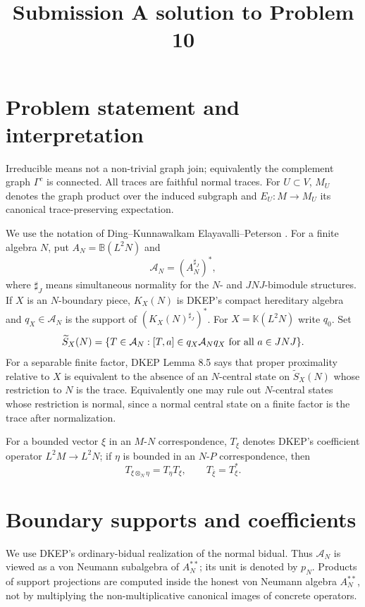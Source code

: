 \documentclass[12pt]{article}
\newcommand{\cA}{\mathcal A}
\begin{document}
\title{Submission A solution to Problem 10}
\date{}
\maketitle


\section*{Problem statement and interpretation}

Irreducible means not a non-trivial graph join; equivalently the complement
graph \(\Gamma^c\) is connected.  All traces are faithful normal traces.  For
\(U\subset V\), \(M_U\) denotes the graph product over the induced subgraph and
\(E_U:M\to M_U\) its canonical trace-preserving expectation.

We use the notation of Ding--Kunnawalkam Elayavalli--Peterson \cite{DKEP}.
For a finite algebra \(N\), put \(A_N=\mathbb B(L^2N)\) and
\[
        \cA_N=(A_N^{\sharp_J})^*,
\]
where \(\sharp_J\) means simultaneous normality for the \(N\)- and
\(JNJ\)-bimodule structures.  If \(X\) is an \(N\)-boundary piece, \(K_X(N)\)
is DKEP's compact hereditary algebra and \(q_X\in\cA_N\) is the support of
\((K_X(N)^{\sharp_J})^*\).  For \(X=\mathbb K(L^2N)\) write \(q_0\).  Set
\[
 \widetilde S_X(N)=\{T\in\cA_N:[T,a]\in q_X\cA_Nq_X\hbox{ for all }
 a\in JNJ\}.
\]
For a separable finite factor, DKEP Lemma 8.5 says that proper proximality
relative to \(X\) is equivalent to the absence of an \(N\)-central state on
\(\widetilde S_X(N)\) whose restriction to \(N\) is the trace.  Equivalently
one may rule out \(N\)-central states whose restriction is normal, since a
normal central state on a finite factor is the trace after normalization.

For a bounded vector \(\xi\) in an \(M\)-\(N\) correspondence, \(T_\xi\) denotes
DKEP's coefficient operator \(L^2M\to L^2N\); if \(\eta\) is bounded in an
\(N\)-\(P\) correspondence, then
\[
        T_{\xi\otimes_N\eta}=T_\eta T_\xi,\qquad
        T_{\bar\xi}=T_\xi^* .                                    \tag{1}
\]

\section*{Boundary supports and coefficients}

We use DKEP's ordinary-bidual realization of the normal bidual.  Thus
\(\cA_N\) is viewed as a von Neumann subalgebra of \(A_N^{**}\); its unit is
denoted by \(p_N\).  Products of support projections are computed inside the
honest von Neumann algebra \(A_N^{**}\), not by multiplying the
non-multiplicative canonical images of concrete operators.
\end{document}

